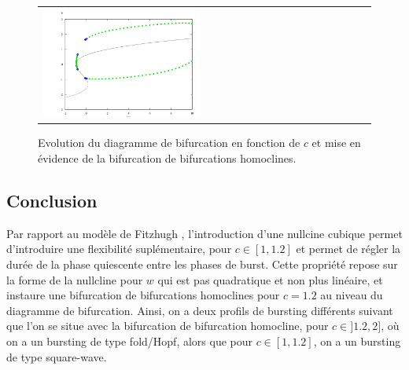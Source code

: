 \documentclass[12pt,a4paper,onecolumn]{article}
\begin{document}
\begin{figure}[htb]
\begin{center}
\begin{tabular}{p{} p{}}
			\includegraphics[width = 0.5\textwidth]{bif_10.png}\subcaption{Pour $c = 1$ : deux bifurcations homoclines}
		\end{tabular}
		\caption{Evolution du diagramme de bifurcation en fonction de $c$ et mise en évidence de la bifurcation de bifurcations homoclines.}
		\label{fig_conclusion}
	\end{center}
\end{figure}

\subsection{Conclusion}
Par rapport au modèle de Fitzhugh \cite{fitzhugh1961impulses}, l'introduction d'une nullcine cubique permet d'introduire une flexibilité suplémentaire, pour $c \in [1, 1.2]$ et permet de régler la durée de la phase quiescente entre les phases de burst. Cette propriété repose sur la forme de la nullcline pour $w$ qui est pas quadratique et non plus linéaire, et instaure une bifurcation de bifurcations homoclines pour $c=1.2$ au niveau du diagramme de bifurcation. Ainsi, on a deux profils de bursting différents suivant que l'on se situe avec la bifurcation de bifurcation homocline, pour $c \in ]1.2, 2]$, où on a un bursting de type fold/Hopf, alors que pour $c \in [1, 1.2]$, on a un bursting de type square-wave.


\printbibliography
\end{document}
